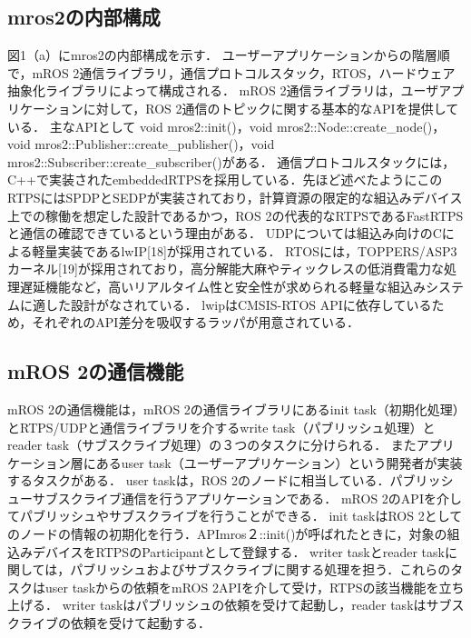 \subsection{mros2の内部構成}
図1（a）にmros2の内部構成を示す．
ユーザーアプリケーションからの階層順で，mROS 2通信ライブラリ，通信プロトコルスタック，RTOS，ハードウェア抽象化ライブラリによって構成される．
mROS 2通信ライブラリは，ユーザアプリケーションに対して，ROS 2通信のトピックに関する基本的なAPIを提供している．
主なAPIとして void mros2::init()，void mros2::Node::create\_node()，void mros2::Publisher::create\_publisher()，void mros2::Subscriber::create\_subscriber()がある．
通信プロトコルスタックには，C++で実装されたembeddedRTPSを採用している．先ほど述べたようにこのRTPSにはSPDPとSEDPが実装されており，計算資源の限定的な組込みデバイス上での稼働を想定した設計であるかつ，ROS 2の代表的なRTPSであるFastRTPSと通信の確認できているという理由がある．
UDPについては組込み向けのCによる軽量実装であるlwIP[18]が採用されている．
RTOSには，TOPPERS/ASP3カーネル[19]が採用されており，高分解能大麻やティックレスの低消費電力な処理遅延機能など，高いリアルタイム性と安全性が求められる軽量な組込みシステムに適した設計がなされている．
lwipはCMSIS-RTOS APIに依存しているため，それぞれのAPI差分を吸収するラッパが用意されている．
\subsection{mROS 2の通信機能}
mROS 2の通信機能は，mROS 2の通信ライブラリにあるinit task（初期化処理）とRTPS/UDPと通信ライブラリを介するwrite task（パブリッシュ処理）とreader task（サブスクライブ処理）の３つのタスクに分けられる．
またアプリケーション層にあるuser task（ユーザーアプリケーション）という開発者が実装するタスクがある．
user taskは，ROS 2のノードに相当している．パブリッシューサブスクライブ通信を行うアプリケーションである．
mROS 2のAPIを介してパブリッシュやサブスクライブを行うことができる．
init taskはROS 2としてのノードの情報の初期化を行う．APImros２::init()が呼ばれたときに，対象の組込みデバイスをRTPSのParticipantとして登録する．
writer taskとreader taskに関しては，パブリッシュおよびサブスクライブに関する処理を担う．これらのタスクはuser taskからの依頼をmROS 2APIを介して受け，RTPSの該当機能を立ち上げる．
writer taskはパブリッシュの依頼を受けて起動し，reader taskはサブスクライブの依頼を受けて起動する．
